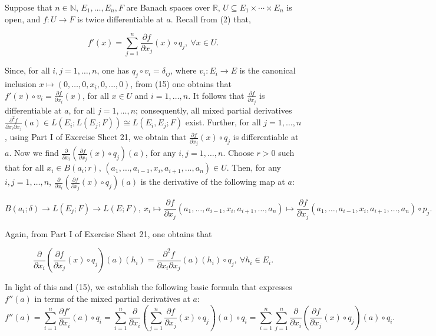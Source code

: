 \documentclass{book}
\begin{document}
Suppose that $n \in \mathbb{N}$, $E_1, \ldots, E_n, F$ are Banach spaces over $\mathbb{R}$, $U \subseteq E_1 \times \cdots \times E_n$ is open, and $f : U \to F$ is twice differentiable at $a$. Recall from (2) that,

\[
f'(x) = \sum_{j=1}^n \frac{\partial f}{\partial x_j}(x) \circ q_j, \ \forall x \in U.
\tag{15}
\]

Since, for all $i, j = 1, \ldots, n$, one has $q_j \circ v_i = \delta_{ij}$, where $v_i : E_i \to E$ is the canonical inclusion $x \mapsto (0, \ldots, 0, x_i, 0, \ldots, 0)$, from (15) one obtains that $f'(x) \circ v_i = \frac{\partial f}{\partial x_i}(x)$, for all $x \in U$ and $i = 1, \ldots, n$. It follows that $\frac{\partial f}{\partial x_j}$ is differentiable at $a$, for all $j = 1, \ldots, n$; consequently, all mixed partial derivatives $\frac{\partial^2 f}{\partial x_i \partial x_j}(a) \in L(E_i; L(E_j; F)) \cong L(E_i, E_j; F)$ exist. Further, for all $j = 1, \ldots, n$, using Part I of Exercise Sheet 21, we obtain that $\frac{\partial f}{\partial x_j}(x) \circ q_j$ is differentiable at $a$. Now we find $\frac{\partial}{\partial x_i} \left( \frac{\partial f}{\partial x_j}(x) \circ q_j \right)(a)$, for any $i, j = 1, \ldots, n$. Choose $r > 0$ such that for all $x_i \in B(a_i; r)$, $(a_1, \ldots, a_{i-1}, x_i, a_{i+1}, \ldots, a_n) \in U$. Then, for any $i, j = 1, \ldots, n$, $\frac{\partial}{\partial x_i} \left( \frac{\partial f}{\partial x_j}(x) \circ q_j \right)(a)$ is the derivative of the following map at $a$:

\[
B(a_i; \delta) \to L(E_j; F) \to L(E; F), \ x_i \mapsto \frac{\partial f}{\partial x_j}(a_1, \ldots, a_{i-1}, x_i, a_{i+1}, \ldots, a_n) \mapsto \frac{\partial f}{\partial x_j}(a_1, \ldots, a_{i-1}, x_i, a_{i+1}, \ldots, a_n) \circ p_j.
\]

Again, from Part I of Exercise Sheet 21, one obtains that

\[
\frac{\partial}{\partial x_i} \left( \frac{\partial f}{\partial x_j}(x) \circ q_j \right)(a)(h_i) = \frac{\partial^2 f}{\partial x_i \partial x_j}(a)(h_i) \circ q_j, \ \forall h_i \in E_i.
\]

In light of this and (15), we establish the following basic formula that expresses $f''(a)$ in terms of the mixed partial derivatives at $a$:
\[
f''(a) = \sum_{i=1}^n \frac{\partial f'}{\partial x_i}(a) \circ q_i
= \sum_{i=1}^n \frac{\partial}{\partial x_i} \left( \sum_{j=1}^n \frac{\partial f}{\partial x_j}(x) \circ q_j \right)(a) \circ q_i
= \sum_{i=1}^n \sum_{j=1}^n \frac{\partial}{\partial x_i} \left( \frac{\partial f}{\partial x_j}(x) \circ q_j \right)(a) \circ q_i.
\]
\end{document}
